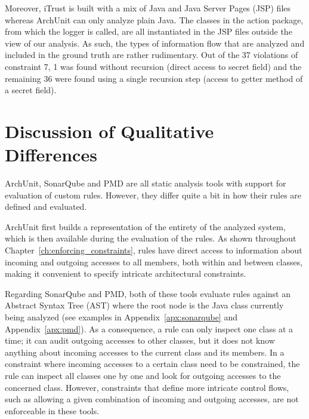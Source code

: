 Moreover, iTrust is built with a mix of Java and Java Server Pages (JSP) files whereas ArchUnit can only analyze plain Java. The classes in the action package, from which the logger is called, are all instantiated in the JSP files outside the view of our analysis. As such, the types of information flow that are analyzed and included in the ground truth are rather rudimentary. Out of the 37 violations of constraint 7, 1 was found without recursion (direct access to secret field) and the remaining 36 were found using a single recursion step (access to getter method of a secret field).




\section{Discussion of Qualitative Differences}
ArchUnit, SonarQube and PMD are all static analysis tools with support for evaluation of custom rules. However, they differ quite a bit in how their rules are defined and evaluated.

ArchUnit first builds a representation of the entirety of the analyzed system, which is then available during the evaluation of the rules. As shown throughout Chapter~\ref{ch:enforcing_constraints}, rules have direct access to information about incoming and outgoing accesses to all members, both within and between classes, making it convenient to specify intricate architectural constraints.

Regarding SonarQube and PMD, both of these tools evaluate rules against an Abstract Syntax Tree (AST) where the root node is the Java class currently being analyzed (see examples in Appendix~\ref{apx:sonarqube} and Appendix~\ref{apx:pmd}). As a consequence, a rule can only inspect one class at a time; it can audit outgoing accesses to other classes, but it does not know anything about incoming accesses to the current class and its members.
In a constraint where incoming accesses to a certain class need to be constrained, the rule can inspect all classes one by one and look for outgoing accesses to the concerned class. However, constraints that define more intricate control flows, such as allowing a given combination of incoming and outgoing accesses, are not enforceable in these tools.

